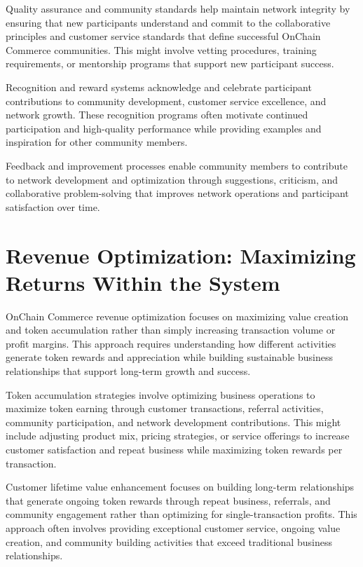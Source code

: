 \documentclass[
  Letterpaper,
]{scrbook}
\begin{document}
Quality assurance and community standards help maintain network
integrity by ensuring that new participants understand and commit to the
collaborative principles and customer service standards that define
successful OnChain Commerce communities. This might involve vetting
procedures, training requirements, or mentorship programs that support
new participant success.

Recognition and reward systems acknowledge and celebrate participant
contributions to community development, customer service excellence, and
network growth. These recognition programs often motivate continued
participation and high-quality performance while providing examples and
inspiration for other community members.

Feedback and improvement processes enable community members to
contribute to network development and optimization through suggestions,
criticism, and collaborative problem-solving that improves network
operations and participant satisfaction over time.

\section{Revenue Optimization: Maximizing Returns Within the
System}\label{revenue-optimization-maximizing-returns-within-the-system}

OnChain Commerce revenue optimization focuses on maximizing value
creation and token accumulation rather than simply increasing
transaction volume or profit margins. This approach requires
understanding how different activities generate token rewards and
appreciation while building sustainable business relationships that
support long-term growth and success.

Token accumulation strategies involve optimizing business operations to
maximize token earning through customer transactions, referral
activities, community participation, and network development
contributions. This might include adjusting product mix, pricing
strategies, or service offerings to increase customer satisfaction and
repeat business while maximizing token rewards per transaction.

Customer lifetime value enhancement focuses on building long-term
relationships that generate ongoing token rewards through repeat
business, referrals, and community engagement rather than optimizing for
single-transaction profits. This approach often involves providing
exceptional customer service, ongoing value creation, and community
building activities that exceed traditional business relationships.
\end{document}
